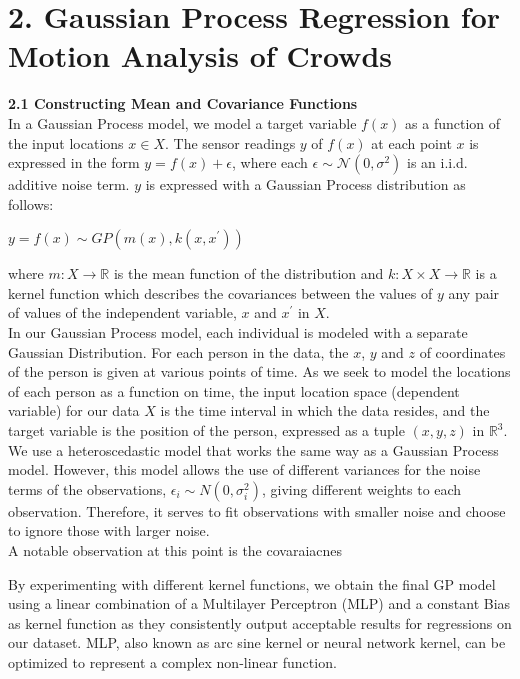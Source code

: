 \documentclass[letterpaper]{article}
\begin{document}
\section{2.  Gaussian Process Regression for Motion Analysis of Crowds}

{\bf2.1  Constructing Mean and Covariance Functions} \\

In a Gaussian Process model, we model a target variable $f(x)$ as a function of the input locations $x \in X$. The sensor readings $y$ of $f(x)$ at each point $x$ is expressed in the form $y = f(x) + \epsilon$, where each $\epsilon \sim \mathcal{N}(0, \sigma^2)$ is an i.i.d. additive noise term. $y$ is expressed with a Gaussian Process distribution as follows:

\begin{center}
$y = f(x) \sim GP(m(x), k(x,x^\prime))$
\end{center}

where $m: X \rightarrow \mathbb{R}$ is the mean function of the distribution and $k: X \times X \rightarrow \mathbb{R}$ is a kernel function which describes the covariances between the values of $y$ any pair of values of the independent variable, $x$ and $x^\prime$ in $X$. \\

In our Gaussian Process model, each individual is modeled with a separate Gaussian Distribution. For each person in the data, the $x$, $y$ and $z$ of coordinates of the person is given at various points of time. As we seek to model the locations of each person as a function on time, the input location space (dependent variable) for our data $X$ is the time interval in which the data resides, and the target variable is the position of the person, expressed as a tuple $(x,y,z)$ in $\mathbb{R}^3$. \\

We use a heteroscedastic model that works the same way as a Gaussian Process model. However, this model allows the use of different variances for the noise terms of the observations, $\epsilon_i \sim N(0, \sigma_i^2)$, giving different weights to each observation. Therefore, it serves to fit observations with smaller noise and choose to ignore those with larger noise. \\

A notable observation at this point is the covaraiacnes

By experimenting with different kernel functions, we obtain the final GP model using a linear combination of a Multilayer Perceptron (MLP) and a constant Bias as kernel function as they consistently output acceptable results for regressions on our dataset. MLP, also known as arc sine kernel or neural network kernel, can be optimized to represent a complex non-linear function. \\
\end{document}
